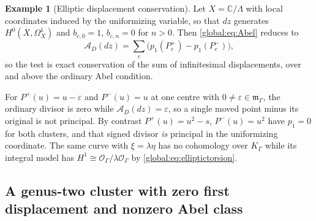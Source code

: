 \documentclass[11pt,letterpaper]{article}
\theoremstyle{definition}
\newtheorem{example}[example]{Example}
\theoremstyle{remark}
\newcommand{\C}{\mathbb C}
\newcommand{\OO}{\mathcal O}
\newcommand{\KK}{K_\Gamma}
\newcommand{\mK}{\mathfrak m_\Gamma}
\numberwithin{equation}{section}
\begin{document}
\begin{example}[Elliptic displacement conservation]\label{global:ex:elliptic}
Let $X=\C/\Lambda$ with local coordinates induced by the uniformizing variable, so that $dz$ generates $H^0(X,\Omega^1_X)$ and $b_{c,0}=1$, $b_{c,n}=0$ for $n>0$. Then \eqref{global:eq:Abel} reduces to
\begin{equation}\label{global:eq:ellipticAbel}
  \mathcal A_D(dz)=\sum_c\bigl(p_1(P_c^+)-p_1(P_c^-)\bigr),
\end{equation}
so the test is exact conservation of the sum of infinitesimal displacements, over and above the ordinary Abel condition.

For $P^+(u)=u-\varepsilon$ and $P^-(u)=u$ at one centre with $0\ne\varepsilon\in\mK$, the ordinary divisor is zero while $\mathcal A_D(dz)=\varepsilon$, so a single moved point minus its original is not principal. By contrast $P^+(u)=u^2-s$, $P^-(u)=u^2$ have $p_1=0$ for both clusters, and that signed divisor \emph{is} principal in the uniformizing coordinate. The same curve with $\xi=\lambda\eta$ has no cohomology over $\KK$ while its integral model has $H^1\cong\OO_\Gamma/\lambda\OO_\Gamma$ by \eqref{global:eq:elliptictorsion}.
\end{example}

\subsection{A genus-two cluster with zero first displacement and nonzero Abel class}
\end{document}
